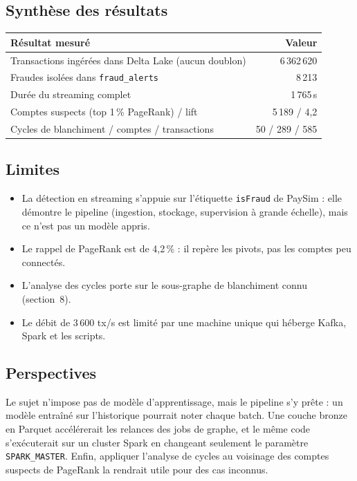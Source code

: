 \documentclass[11pt,a4paper]{article}
\begin{document}
\subsection{Synth\`ese des r\'esultats}
\begin{center}
\small
\begin{tabular}{@{}p{8.2cm}r@{}}
\toprule
\textbf{R\'esultat mesur\'e} & \textbf{Valeur} \\
\midrule
Transactions ing\'er\'ees dans Delta Lake (aucun doublon) & 6\,362\,620 \\
Fraudes isol\'ees dans \texttt{fraud\_alerts} & 8\,213 \\
Dur\'ee du streaming complet & 1\,765\,s \\
Comptes suspects (top 1\,\% PageRank) / lift & 5\,189 / 4,2 \\
Cycles de blanchiment / comptes / transactions & 50 / 289 / 585 \\
\bottomrule
\end{tabular}
\end{center}

\subsection{Limites}
\begin{itemize}
  \item La d\'etection en streaming s'appuie sur l'\'etiquette \texttt{isFraud} de PaySim : elle d\'emontre le pipeline (ingestion, stockage, supervision \`a grande \'echelle), mais ce n'est pas un mod\`ele appris.
  \item Le rappel de PageRank est de 4,2\,\% : il rep\`ere les pivots, pas les comptes peu connect\'es.
  \item L'analyse des cycles porte sur le sous-graphe de blanchiment connu (section~8).
  \item Le d\'ebit de 3\,600 tx/s est limit\'e par une machine unique qui h\'eberge Kafka, Spark et les scripts.
\end{itemize}

\subsection{Perspectives}
Le sujet n'impose pas de mod\`ele d'apprentissage, mais le pipeline s'y pr\^ete : un mod\`ele entra\^in\'e sur l'historique pourrait noter chaque batch. Une couche \og bronze \fg{} en Parquet acc\'el\'ererait les relances des jobs de graphe, et le m\^eme code s'ex\'ecuterait sur un cluster Spark en changeant seulement le param\`etre \texttt{SPARK\_MASTER}. Enfin, appliquer l'analyse de cycles au voisinage des comptes suspects de PageRank la rendrait utile pour des cas inconnus.
\end{document}
